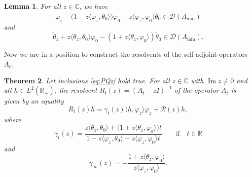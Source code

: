 \documentclass[pdftex]{sigma}%
\numberwithin{equation}{section}
\newtheorem{Theorem}{Theorem}[section]
\newtheorem{Lemma}[Theorem]{Lemma}
\begin{document}
 \begin{Lemma}\label{PQ+}
 For all $z \in {\mathbb C}$, we have
 \[
\varphi_{z} -\big( 1-z \langle \varphi_{z}, \theta_{0} \rangle \big) \varphi_{0} - z \langle \varphi_{z}, \varphi_0\rangle \tilde\theta_{0} \in {\mathcal D} (A_{\min})
\]
and
 \[
\tilde\theta_{z} + z \langle \theta_{z}, \theta_0\rangle \varphi_0 - (1+z \langle \theta_{z}, \varphi_{0}\rangle ) \tilde\theta_{0} \in {\mathcal D} (A_{\min}).
\]
 \end{Lemma}

 Now we are in a position to construct the resolvents of the self-adjoint operators $A_t$.

 \begin{Theorem}\label{RES}
 Let inclusions \eqref{eq:PQz} hold true.
 For all $z\in {\mathbb C}$ with $\operatorname{Im} z\neq 0$ and all $h\in L^2 ({\mathbb R}_{+})$, the resolvent $R_t (z)= (A_t-zI)^{-1}$ of the operator $A_t$ is given by an equality
 \begin{equation}
R_{t} (z) h = \gamma_{t} (z) \langle h, \varphi_{\bar{z}}\rangle \varphi_{z}+ {\mathcal R}(z)h,
 \label{eq:RES1}\end{equation}
 where
 \begin{equation}
\gamma_{t}(z)= \frac{z \langle \theta_{z}, \theta_{0}\rangle +\big( 1+ z \langle \theta_{z}, \varphi_{0}\rangle \big)t }
{1- z \langle \varphi_{z}, \theta_{0}\rangle -z \langle \varphi_{z}, \varphi_{0}\rangle t } \qquad \mbox{if} \quad t\in {\mathbb R}
 \label{eq:RES2}\end{equation}
 and
 \begin{equation}
\gamma_{\infty}(z)= - \frac{ 1+ z \langle \theta_{z}, \varphi_{0}\rangle }
{z \langle \varphi_{z}, \varphi_{0}\rangle }.
 \label{eq:RES3}\end{equation}
 \end{Theorem}
\end{document}
